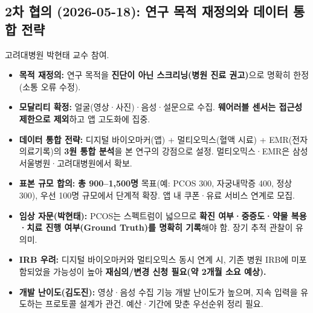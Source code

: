 \documentclass[11pt,a4paper]{article}
\begin{document}
\subsection{2차 협의 (2026-05-18): 연구 목적 재정의와 데이터 통합 전략}
고려대병원 박현태 교수 참여.
\begin{itemize}
  \item \textbf{목적 재정의:} 연구 목적을 \textbf{진단이 아닌 스크리닝(병원 진료 권고)}으로 명확히 한정(소통 오류 수정).
  \item \textbf{모달리티 확정:} 얼굴(영상·사진)·음성·설문으로 수집. \textbf{웨어러블 센서는 접근성 제한으로 제외}하고 앱 고도화에 집중.
  \item \textbf{데이터 통합 전략:} 디지털 바이오마커(앱) + 멀티오믹스(혈액 시료) + EMR(전자의료기록)의 \textbf{3원 통합 분석}을 본 연구의 강점으로 설정. 멀티오믹스·EMR은 삼성서울병원·고려대병원에서 확보.
  \item \textbf{표본 규모 합의:} \textbf{총 900{--}1{,}500명} 목표(예: PCOS 300, 자궁내막증 400, 정상 300), 우선 100명 규모에서 단계적 확장. 앱 내 쿠폰·유료 서비스 연계로 모집.
  \item \textbf{임상 자문(박현태):} PCOS는 스펙트럼이 넓으므로 \textbf{확진 여부·중증도·약물 복용·치료 진행 여부(Ground Truth)를 명확히 기록}해야 함. 장기 추적 관찰이 유의미.
  \item \textbf{IRB 우려:} 디지털 바이오마커와 멀티오믹스 동시 연계 시, 기존 병원 IRB에 미포함되었을 가능성이 높아 \textbf{재심의/변경 신청 필요(약 2개월 소요 예상).}
  \item \textbf{개발 난이도(김도진):} 영상·음성 수집 기능 개발 난이도가 높으며, 지속 입력을 유도하는 프로토콜 설계가 관건. 예산·기간에 맞춘 우선순위 정리 필요.
\end{itemize}
\end{document}
